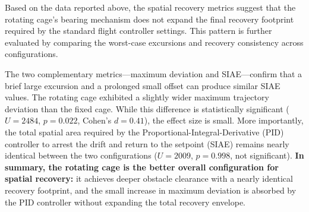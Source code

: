 Based on the data reported above, the spatial recovery metrics suggest that the rotating cage's bearing mechanism does not expand the final recovery footprint required by the standard flight controller settings. This pattern is further evaluated by comparing the worst-case excursions and recovery consistency across configurations.

The two complementary metrics---maximum deviation and SIAE---confirm that a brief large excursion and a prolonged small offset can produce similar SIAE values. The rotating cage exhibited a slightly wider maximum trajectory deviation than the fixed cage. While this difference is statistically significant ($U = 2484$, $p = 0.022$, Cohen's $d = 0.41$), the effect size is small. More importantly, the total spatial area required by the Proportional-Integral-Derivative (PID) controller to arrest the drift and return to the setpoint (SIAE) remains nearly \mbox{identical} between the two configurations ($U = 2009$, $p = 0.998$, not significant). \textbf{In summary, the rotating cage is the better overall configuration for spatial recovery:} it achieves deeper obstacle clearance with a nearly identical recovery footprint, and the small increase in maximum deviation is absorbed by the PID controller without expanding the total recovery envelope.

\begin{table}[htbp]
\centering
\caption{Spatial and Clearance Metrics. Summary of key comparative spatial metrics between cage configurations. All values are mean~$\pm$~standard deviation.}
\label{tab:spatial_metrics}
%
\end{table}

